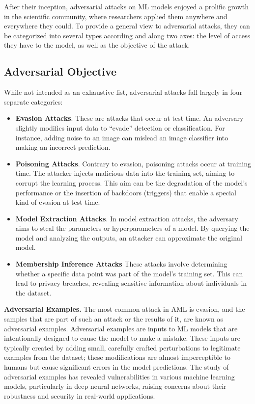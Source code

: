 After their inception, adversarial attacks on ML models enjoyed a prolific growth in the scientific community, where researchers applied them anywhere and everywhere they could.
To provide a general view to adversarial attacks, they can be categorized into several types according and along two axes: the level of access they have to the model, as well as the objective of the attack.

\subsection{Adversarial Objective}

While not intended as an exhaustive list, adversarial attacks fall largely in four separate categories:

\begin{itemize}
    \item \textbf{Evasion Attacks}. These are attacks that occur at test time. An adversary slightly modifies input data to ``evade'' detection or classification. For instance, adding noise to an image can mislead an image classifier into making an incorrect prediction.
    \item \textbf{Poisoning Attacks}. Contrary to evasion, poisoning attacks occur at training time. The attacker injects malicious data into the training set, aiming to corrupt the learning process. This aim can be the degradation of the model's performance or the insertion of backdoors (triggers) that enable a special kind of evasion at test time.
    \item \textbf{Model Extraction Attacks}. In model extraction attacks, the adversary aims to steal the parameters or hyperparameters of a model. By querying the model and analyzing the outputs, an attacker can approximate the original model.
    \item \textbf{Membership Inference Attacks} These attacks involve determining whether a specific data point was part of the model's training set. This can lead to privacy breaches, revealing sensitive information about individuals in the dataset.
\end{itemize}

\textbf{Adversarial Examples.} The most common attack in \gls{AML} is evasion, and the samples that are part of such an attack or the results of it, are known as adversarial examples.
Adversarial examples are inputs to \gls{ML} models that are intentionally designed to cause the model to make a mistake.
These inputs are typically created by adding small, carefully crafted perturbations to legitimate examples from the dataset; these modifications are almost imperceptible to humans but cause significant errors in the model predictions.
The study of adversarial examples has revealed vulnerabilities in various machine learning models, particularly in deep neural networks, raising concerns about their robustness and security in real-world applications.



